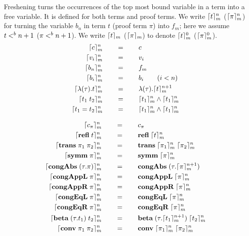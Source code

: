 \documentclass[10pt]{article}
\begin{document}
\begin{mydef}[Freshening]\label{def:stlcd-freshening}
Freshening turns the occurrences of the top most bound variable in a
term into a free variable. It is defined for both terms and proof
terms. We write $\lceil t\rceil^{n}_{m}$ ($\lceil\pi\rceil^{n}_{m}$) for
turning the variable $b_n$ in term $t$ (proof term $\pi$) into $f_m$;
here we assume $t <^{b} n+1$ ($\pi <^{b} n+1$). We write
$\lceil t\rceil_{m}$ ($\lceil\pi\rceil_{m}$) to denote $\lceil t\rceil^{0}_{m}$
($\lceil\pi\rceil^{0}_{m}$).
%
\\

\begin{align*}
  \lceil c\rceil^{n}_{m}   & \qquad = \qquad c\\
  \lceil v_i\rceil^{n}_{m} & \qquad = \qquad v_i\\
  \lceil b_n\rceil^{n}_{m} & \qquad = \qquad f_m\\
  \lceil b_i\rceil^{n}_{m} & \qquad = \qquad b_i  \qquad (i < n)\\
  \lceil\lambda{(\tau)}.{t}\rceil^{n}_{m} & \qquad = \qquad 
    \lambda{(\tau)}.{\lceil t\rceil^{n+1}_{m}}\\
  \lceil t_1\; t_2\rceil^{n}_{m} & \qquad = \qquad
    \lceil t_1\rceil^{n}_{m} \land \lceil t_1\rceil^{n}_{m}\\
  \lceil t_1 = t_2\rceil^{n}_{m} & \qquad = \qquad
    \lceil t_1\rceil^{n}_{m} \land \lceil t_1\rceil^{n}_{m}
\end{align*}


\begin{align*}
  \lceil c_\pi\rceil^{n}_{m}     & \qquad = \qquad c_\pi\\
  \lceil\mbox{\bf refl}\; t\rceil^{n}_{m} & \qquad = \qquad \mbox{\bf refl}\;\lceil t\rceil^{n}_{m}\\
  \lceil\mbox{\bf trans}\;\pi_1\; \pi_2\rceil^{n}_{m} & \qquad = \qquad 
    \mbox{\bf trans}\;\lceil\pi_1\rceil^{n}_{m}\; \lceil\pi_2\rceil^{n}_{m}\\
  \lceil\mbox{\bf symm}\; \pi\rceil^{n}_{m} & \qquad = \qquad 
    \mbox{\bf symm}\; \lceil\pi\rceil^{n}_{m}\\
  \lceil\mbox{\bf congAbs}\;(\tau.\pi)\rceil^{n}_{m} & \qquad = \qquad 
    \mbox{\bf congAbs}\;(\tau.\lceil\pi\rceil^{n+1}_{m})\\
  \lceil\mbox{\bf congAppL}\;\pi\rceil^{n}_{m} & \qquad = \qquad 
    \mbox{\bf congAppL}\;\lceil\pi\rceil^{n}_{m}\\
  \lceil\mbox{\bf congAppR}\;\pi\rceil^{n}_{m} & \qquad = \qquad 
    \mbox{\bf congAppR}\;\lceil\pi\rceil^{n}_{m}\\
  \lceil\mbox{\bf congEqL}\;\pi\rceil^{n}_{m} & \qquad = \qquad 
    \mbox{\bf congEqL}\;\lceil\pi\rceil^{n}_{m}\\
  \lceil\mbox{\bf congEqR}\;\pi\rceil^{n}_{m} & \qquad = \qquad 
    \mbox{\bf congEqR}\;\lceil\pi\rceil^{n}_{m}\\
  \lceil\mbox{\bf beta}\;(\tau.t_1)\; t_2\rceil^{n}_{m} & \qquad = \qquad 
    \mbox{\bf beta}\;(\tau.\lceil t_1\rceil^{n+1}_{m})\; \lceil t_2\rceil^{n}_{m}\\
  \lceil\mbox{\bf conv}\; \pi_1\; \pi_2\rceil^{n}_{m} & \qquad = \qquad
    \mbox{\bf conv}\; \lceil\pi_1\rceil^{n}_{m}\; \lceil\pi_2\rceil^{n}_{m}
\end{align*}
\end{mydef}
\end{document}

